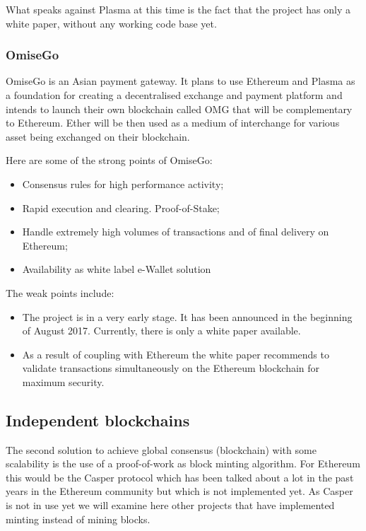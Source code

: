 What speaks against Plasma at this time is the fact that the project has only a white paper, without any working code base yet.

\subsubsection{OmiseGo}
OmiseGo is an Asian payment gateway. It plans to use Ethereum and Plasma as a foundation for creating a decentralised exchange and payment platform \cite{OMG} and intends to launch their own blockchain called OMG that will be complementary to Ethereum. Ether will be then used as a medium of interchange for various asset being exchanged on their blockchain.

Here are some of the strong points of OmiseGo:
\begin{itemize}
    \item Consensus rules for high performance activity;
    \item Rapid execution and clearing. Proof-of-Stake;
    \item Handle extremely high volumes of transactions and of final delivery on Ethereum;
    \item Availability as white label e-Wallet solution
\end{itemize}

The weak points include:

\begin{itemize}
    \item The project is in a very early stage. It has been announced in the beginning of August 2017. Currently, there is only a white paper available.
    \item As a result of coupling with Ethereum the white paper recommends to validate transactions simultaneously on the Ethereum blockchain for maximum security.
\end{itemize}

\subsection{Independent blockchains}
The second solution to achieve global consensus (blockchain) with some scalability is the use of a proof-of-work as block minting algorithm. For Ethereum this would be the Casper protocol which has been talked about a lot in the past years in the Ethereum community but which is not implemented yet. As Casper is not in use yet we will examine here other projects that have implemented minting instead of mining blocks.

